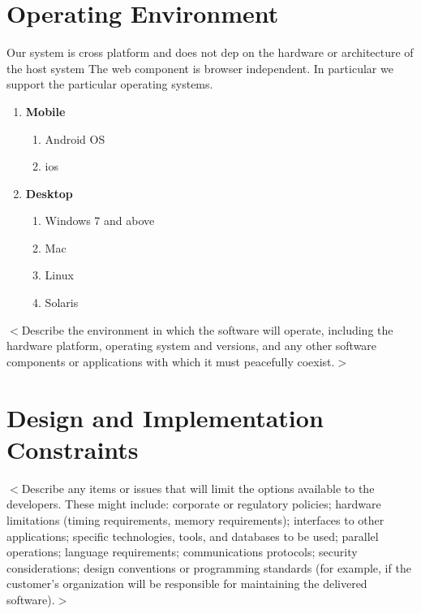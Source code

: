 \documentclass{scrreprt}
\begin{document}

\section{Operating Environment}
  Our system is cross platform and does not dep
 on the hardware or architecture of the host system The web component is browser independent. In particular we support the particular operating systems.
  \begin{enumerate}
  \item \textbf{Mobile}\\
  \begin{enumerate}
  \item Android OS
  \item ios
  \end{enumerate}
  \item \textbf{Desktop}\\
  \begin{enumerate}
     \item Windows 7 and above
     \item Mac
     \item Linux
     \item Solaris
  \end{enumerate}
  \end{enumerate}
 
$<$Describe the environment in which the software will operate, including the 
hardware platform, operating system and versions, and any other software 
components or applications with which it must peacefully coexist.$>$
 
\section{Design and Implementation Constraints}
$<$Describe any items or issues that will limit the options available to the 
developers. These might include: corporate or regulatory policies; hardware 
limitations (timing requirements, memory requirements); interfaces to other 
applications; specific technologies, tools, and databases to be used; parallel 
operations; language requirements; communications protocols; security 
considerations; design conventions or programming standards (for example, if the 
customer’s organization will be responsible for maintaining the delivered 
software).$>$
\end{document}
